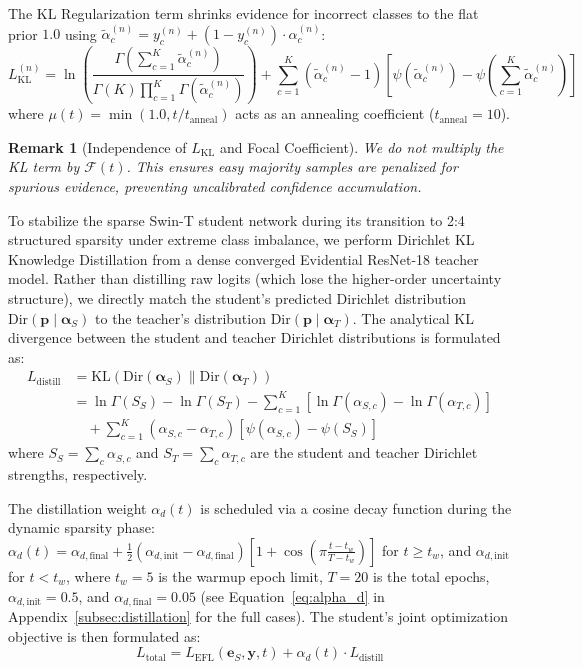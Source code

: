 \documentclass[letterpaper]{article} %
\newcommand{\Dir}{\text{Dir}}
\newcommand{\KL}{\text{KL}}
\newtheorem{remark}{Remark}
\begin{document}
The KL Regularization term shrinks evidence for incorrect classes to the flat prior $1.0$ using $\tilde{\alpha}_c^{(n)} = y_c^{(n)} + (1 - y_c^{(n)}) \cdot \alpha_c^{(n)}$:
\begin{equation}\label{eq:kl_loss_n}
    L_{\text{KL}}^{(n)} = \ln \left( \frac{\Gamma\left(\sum_{c=1}^K \tilde{\alpha}_c^{(n)}\right)}{\Gamma(K) \prod_{c=1}^K \Gamma(\tilde{\alpha}_c^{(n)})} \right) + \sum_{c=1}^K (\tilde{\alpha}_c^{(n)} - 1)\left[\psi(\tilde{\alpha}_c^{(n)}) - \psi\!\left(\sum_{c=1}^K \tilde{\alpha}_c^{(n)}\right)\right]
\end{equation}
where $\mu(t) = \min(1.0, t / t_{\text{anneal}})$ acts as an annealing coefficient ($t_{\text{anneal}} = 10$).
\begin{remark}[Independence of $L_{\text{KL}}$ and Focal Coefficient]
We do not multiply the KL term by $\mathcal{F}(t)$. This ensures easy majority samples are penalized for spurious evidence, preventing uncalibrated confidence accumulation.
\end{remark}

To stabilize the sparse Swin-T student network during its transition to 2:4 structured sparsity under extreme class imbalance, we perform Dirichlet KL Knowledge Distillation from a dense converged Evidential ResNet-18 teacher model. Rather than distilling raw logits (which lose the higher-order uncertainty structure), we directly match the student's predicted Dirichlet distribution $\Dir(\bm{p} \mid \bm{\alpha}_S)$ to the teacher's distribution $\Dir(\bm{p} \mid \bm{\alpha}_T)$. The analytical KL divergence between the student and teacher Dirichlet distributions is formulated as:
\begin{align}
    L_{\text{distill}} &= \KL(\Dir(\bm{\alpha}_S) \| \Dir(\bm{\alpha}_T)) \nonumber \\
    &= \ln\Gamma(S_S) - \ln\Gamma(S_T) - \sum_{c=1}^K \left[\ln\Gamma(\alpha_{S,c}) - \ln\Gamma(\alpha_{T,c})\right] \nonumber \\
    &\quad + \sum_{c=1}^K (\alpha_{S,c} - \alpha_{T,c})\left[\psi(\alpha_{S,c}) - \psi(S_S)\right] \label{eq:dir_kl_full}
\end{align}
where $S_S = \sum_c \alpha_{S,c}$ and $S_T = \sum_c \alpha_{T,c}$ are the student and teacher Dirichlet strengths, respectively.

The distillation weight $\alpha_d(t)$ is scheduled via a cosine decay function during the dynamic sparsity phase: $\alpha_d(t) = \alpha_{d,\text{final}} + \frac{1}{2}(\alpha_{d,\text{init}} - \alpha_{d,\text{final}}) [1 + \cos(\pi \frac{t - t_w}{T - t_w})]$ for $t \ge t_w$, and $\alpha_{d,\text{init}}$ for $t < t_w$, where $t_w = 5$ is the warmup epoch limit, $T = 20$ is the total epochs, $\alpha_{d,\text{init}} = 0.5$, and $\alpha_{d,\text{final}} = 0.05$ (see Equation~\ref{eq:alpha_d} in Appendix~\ref{subsec:distillation} for the full cases). The student's joint optimization objective is then formulated as:
\begin{equation}\label{eq:total_loss}
    L_{\text{total}} = L_{\text{EFL}}(\bm{e}_S, \bm{y}, t) + \alpha_d(t) \cdot L_{\text{distill}}
\end{equation}
\end{document}
